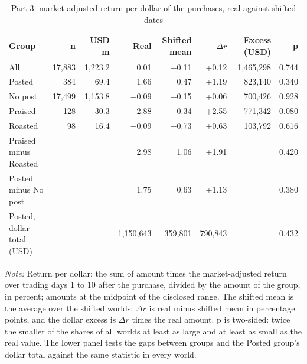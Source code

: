 \begin{table}[htbp]
\centering
\small
\setlength{\tabcolsep}{4pt}
\caption{Part 3: market-adjusted return per dollar of the purchases, real against shifted dates}
\label{tab:part3}
\begin{tabular}{lrrrrrrr}
\toprule
Group & n & USD m & Real & Shifted mean & $\Delta r$ & Excess (USD) & p \\
\midrule
All & 17,883 & 1,223.2 & 0.01 & $-$0.11 & +0.12 & 1,465,298 & 0.744 \\
Posted & 384 & 69.4 & 1.66 & 0.47 & +1.19 & 823,140 & 0.340 \\
No post & 17,499 & 1,153.8 & $-$0.09 & $-$0.15 & +0.06 & 700,426 & 0.928 \\
Praised & 128 & 30.3 & 2.88 & 0.34 & +2.55 & 771,342 & 0.080 \\
Roasted & 98 & 16.4 & $-$0.09 & $-$0.73 & +0.63 & 103,792 & 0.616 \\
\midrule
Praised minus Roasted &  &  & 2.98 & 1.06 & +1.91 &  & 0.420 \\
Posted minus No post &  &  & 1.75 & 0.63 & +1.13 &  & 0.380 \\
Posted, dollar total (USD) &  &  & 1,150,643 & 359,801 & 790,843 &  & 0.432 \\
\bottomrule
\end{tabular}
\par\medskip
\begin{minipage}{\linewidth}\footnotesize\textit{Note:} Return per dollar: the sum of amount times the market-adjusted return over trading days 1 to 10 after the purchase, divided by the amount of the group, in percent; amounts at the midpoint of the disclosed range. The shifted mean is the average over the shifted worlds; $\Delta r$ is real minus shifted mean in percentage points, and the dollar excess is $\Delta r$ times the real amount. p is two-sided: twice the smaller of the shares of all worlds at least as large and at least as small as the real value. The lower panel tests the gaps between groups and the Posted group's dollar total against the same statistic in every world.\end{minipage}
\end{table}
